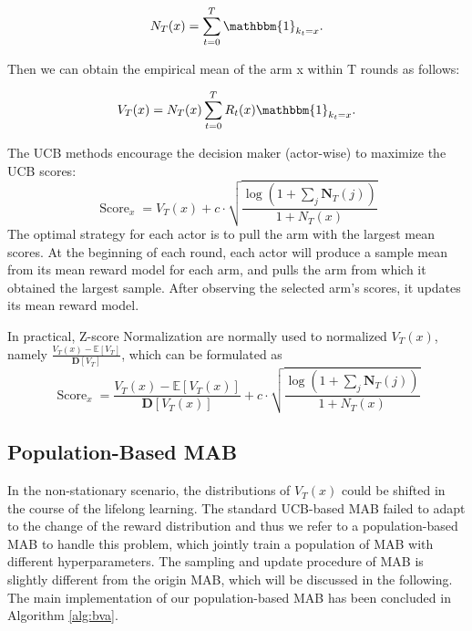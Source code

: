 \begin{equation}
\label{equ: N}
N_T(x)=\sum_{t=0}^T \mathbbm{1}_{k_t = x}.
\end{equation}

Then we can obtain the empirical mean of the arm x within T rounds as follows:

\begin{equation}
\label{equ: ucb score no z-score}
V_T(x) = N_T(x) \sum_{t=0}^T R_t(x)\mathbbm{1}_{k_t = x}. 
\end{equation}

The UCB methods  encourage the decision maker (actor-wise) to maximize the UCB scores:
\begin{equation}
\label{equ: ucb score}
\operatorname{Score}_x  = V_T(x) + c \cdot \sqrt{
\frac{\log (1+\sum_j \textbf{N}_T(j))}{1+ N_T(x)}}
\end{equation}
The optimal strategy for each actor is to pull the arm with the largest mean scores. At the beginning of each round, each actor will produce a sample mean from its mean reward model for each arm, and pulls the arm from which it obtained the largest sample. After observing the selected arm's scores, it updates its mean reward model.

\begin{Remark}
    In practical,  Z-score Normalization  are normally  used to  normalized $V_T(x)$, namely $\frac{V_T(x)-\mathbb{E}[V_T] }{\textbf{D}[V_T] }$, which can be formulated as 
    \begin{equation}
        \operatorname{Score}_x  = \frac{V_T(x)-\mathbb{E}[V_T(x)] }{\textbf{D}[V_T(x)] } + c \cdot \sqrt{
\frac{\log (1+\sum_j \textbf{N}_T(j))}{1+ N_T(x)}}
    \end{equation}
\end{Remark}


\subsection{Population-Based  MAB}
In the non-stationary scenario, the distributions of $V_T(x)$ could be shifted in the course of the lifelong learning. The standard UCB-based MAB failed  to adapt to the change of the reward distribution and thus we refer to a population-based MAB to handle this problem, which jointly train a population of MAB with different hyperparameters. The sampling and update procedure of MAB is slightly different from the origin MAB, which will be discussed in the following. The main implementation of our population-based MAB has been concluded in Algorithm \ref{alg:bva}. 


